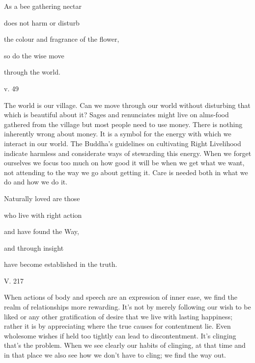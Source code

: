 \documentclass[a4paper,portrait,12pt]{article}
\begin{document}
As a bee gathering nectar 


does not harm or disturb 


the colour and fragrance of the flower,


so do the wise move


through the world.





v. 49





The world is our village. Can we move through our world without disturbing that which is beautiful about it? Sages and renunciates might live on alms-food gathered from the village but most people need to use money. There is nothing inherently wrong about money. It is a symbol for the energy with which we interact in our world. The Buddha's guidelines on cultivating Right Livelihood indicate harmless and considerate ways of stewarding this energy. When we forget ourselves we focus too much on how good it will be when we get what we want, not attending to the way we go about getting it. Care is needed both in what we do and how we do it.














Naturally loved are those 


who live with right action 


and have found the Way, 


and through insight 


have become established in the truth. 





V. 217





When actions of body and speech are an expression of inner ease, we find the realm of relationships more rewarding. It's not by merely following our wish to be liked or any other gratification of desire that we live with lasting happiness; rather it is by appreciating where the true causes for contentment lie. Even wholesome wishes if held too tightly can lead to discontentment. It's clinging that's the problem. When we see clearly our habits of clinging, at that time and in that place we also see how we don't have to cling; we find the way out.
\end{document}
